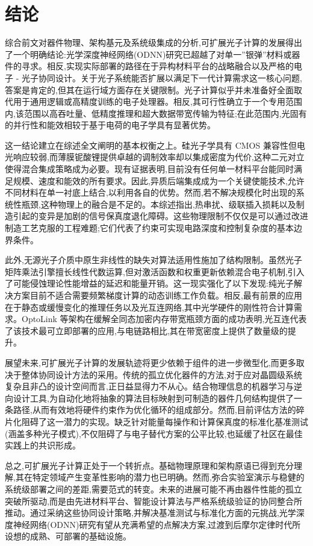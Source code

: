 \section{结论}\label{ux7ed3ux8bba}

综合前文对器件物理、架构基元及系统级集成的分析,可扩展光子计算的发展得出了一个明确结论:光学深度神经网络(ODNN)研究已超越了对单一''银弹''材料或器件的寻求。相反,实现实际部署的路径在于异构材料平台的战略融合以及严格的电子 - 光子协同设计。关于光子系统能否扩展以满足下一代计算需求这一核心问题,答案是肯定的,但其在运行域方面存在关键限制。光子计算似乎并未准备好全面取代用于通用逻辑或高精度训练的电子处理器。相反,其可行性确立于一个专用范围内,该范围以高吞吐量、低精度推理和超大数据带宽传输为特征;在此范围内,光固有的并行性和能效相较于基于电荷的电子学具有显著优势。

这一结论建立在综述全文阐明的基本权衡之上。硅光子学具有 CMOS 兼容性但电光响应较弱,而薄膜铌酸锂提供卓越的调制效率却以集成密度为代价,这种二元对立使得混合集成策略成为必要。现有证据表明,目前没有任何单一材料平台能同时满足规模、速度和能效的所有要求。因此,异质后端集成成为一个关键使能技术,允许不同材料在单一衬底上结合,以利用各自的优势。然而,若不解决规模化时出现的系统性瓶颈,这种物理上的融合是不足的。本综述指出,热串扰、级联插入损耗以及制造引起的变异是加剧的信号保真度退化障碍。这些物理限制不仅仅是可以通过改进制造工艺克服的工程难题;它们代表了约束可实现电路深度和控制复杂度的基本边界条件。

此外,无源光子介质中原生非线性的缺失对算法适用性施加了结构限制。虽然光子矩阵乘法引擎擅长线性代数运算,但对激活函数和权重更新依赖混合电子机制,引入了可能侵蚀理论性能增益的延迟和能量开销。这一现实强化了以下发现:纯光子解决方案目前不适合需要频繁梯度计算的动态训练工作负载。相反,最有前景的应用在于静态或缓慢变化的推理任务以及光互连网络,其中光学硬件的刚性符合计算需求。OptoLink 等架构在缓解全同态加密内存带宽瓶颈方面的成功表明,光互连代表了该技术最可立即部署的应用,与电链路相比,其在带宽密度上提供了数量级的提升。

展望未来,可扩展光子计算的发展轨迹将更少依赖于组件的进一步微型化,而更多取决于整体协同设计方法的采用。传统的孤立优化器件的方法,对于应对晶圆级系统复杂且非凸的设计空间而言,正日益显得力不从心。结合物理信息的机器学习与逆向设计工具,为自动化地将抽象的算法目标映射到可制造的器件几何结构提供了一条路径,从而有效地将硬件约束作为优化循环的组成部分。然而,目前评估方法的碎片化阻碍了这一潜力的实现。缺乏针对能量每操作和计算保真度的标准化基准测试(涵盖多种光子模式),不仅阻碍了与电子替代方案的公平比较,也延缓了社区在最佳实践上的共识形成。

总之,可扩展光子计算正处于一个转折点。基础物理原理和架构原语已得到充分理解,其在特定领域产生变革性影响的潜力也已明确。然而,弥合实验室演示与稳健的系统级部署之间的差距,需要范式的转变。未来的进展可能不再由器件性能的孤立突破所驱动,而是由先进材料平台、智能设计算法与严格系统级验证的协同整合所推动。通过采纳这些协同设计策略,并解决基准测试与标准化方面的元挑战,光学深度神经网络(ODNN)研究有望从充满希望的点解决方案,过渡到后摩尔定律时代所设想的成熟、可部署的基础设施。
